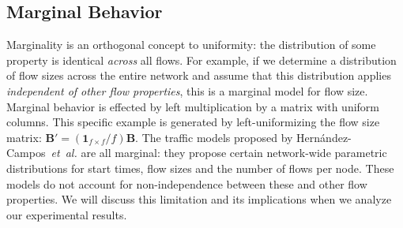 \documentclass[twocolumn,final]{svjour3}
\newcommand{\caps}[1]{{\smaller{#1}}}
\newcommand{\Section}[1]{\hyperref[sec:#1]{Section~\ref*{sec:#1}}}
\newcommand{\FHC}{Hern\'andez-Campos~\textit{et~al.}}
\newcommand{\R}{\mathbb{R}}
\newcommand{\ones}[1]{\mathbf{1}_{#1}}
\newcommand{\zeros}[1]{\mathbf{0}_{#1}}
\newcommand{\mat}[1]{\mathbf{#1}}
\newcommand{\seq}[1]{\left<#1\right>}
\begin{document}

\subsection{Marginal Behavior}

Marginality is an orthogonal concept to uniformity: the distribution of some property is identical \textit{across} all flows. For example, if we determine a distribution of flow sizes across the entire network and assume that this distribution applies \textit{independent of other flow properties}, this is a marginal model for flow size. Marginal behavior is effected by left multiplication by a matrix with uniform columns. This specific example is generated by left-uniformizing the flow size matrix: $\mat{B}' = (\ones{f \times f}/f)\mat{B}$.
The traffic models proposed by {\FHC} are all marginal: they propose certain network-wide parametric distributions for start times, flow sizes and the number of flows per node. These models do not account for non-independence between these and other flow properties. We will discuss this limitation and its implications when we analyze our experimental results.
\end{document}

